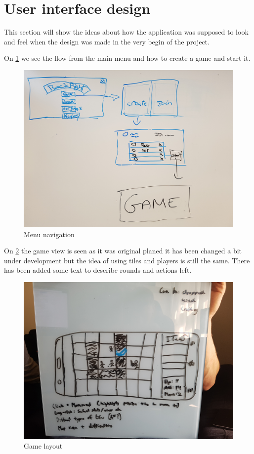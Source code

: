 \section{User interface design}
This section will show the ideas about how the application was supposed to look and feel when the design was made in the very begin of the project.

On \ref{navigation} we see the flow from the main menu and how to create a game and start it.

\begin{figure}
	\centering
	\includegraphics[width=130mm]{images/Gui.png}
	\caption{Menu navigation \label{navigation}}
\end{figure}


On \ref{gameLayout} the game view is seen as it was original planed it has been changed a bit under development but the idea of using tiles and players is still the same. There has been added some text to describe rounds and actions left.

\begin{figure}
	\centering
	\includegraphics[width=130mm]{images/GameView.png}
	\caption{Game layout \label{gameLayout}}
\end{figure}